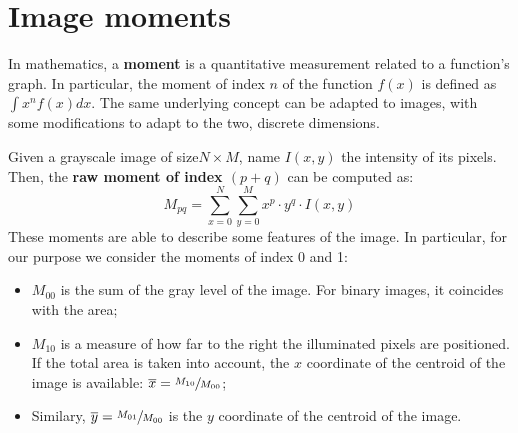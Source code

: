 \section{Image moments}
\label{sec:backgr:moments}

In mathematics, a \textbf{moment} is a quantitative measurement related to a function's graph.
In particular, the moment of index $n$ of the function $f(x)$ is defined as $\int x^n f(x) dx$.
The same underlying concept can be adapted to images, with some modifications to adapt to the two, discrete dimensions.

Given a grayscale image of size$N{\times}M$, name $I(x,y)$ the intensity of its pixels.
Then, the \textbf{raw moment of index $(p{+}q)$} can be computed as: $$M_{pq} = \sum_{x=0}^{N} \sum_{y=0}^{M} x^p{\cdot}y^q{\cdot}I(x,y)$$
These moments are able to describe some features of the image.
In particular, for our purpose we consider the moments of index 0 and 1:
\begin{itemize}
	\itemsep 0em
	\item $M_{00}$ is the sum of the gray level of the image. For binary images, it coincides with the area;
	\item $M_{10}$ is a measure of how far to the right the illuminated pixels are positioned. If the total area is taken into account, the $x$ coordinate of the centroid of the image is available: $\overline{x} = \sfrac{M_{10}}{M_{00}}$;
	\item Similary, $\overline{y} = \sfrac{M_{01}}{M_{00}}$ is the $y$ coordinate of the centroid of the image.
\end{itemize}
